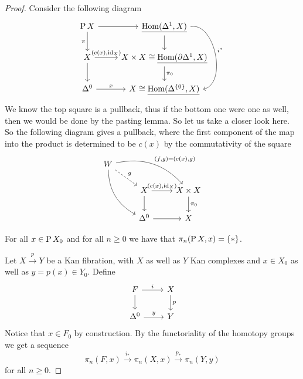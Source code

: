 \begin{proof}
    Consider the following diagram
    \[
    \begin{tikzcd}
        \Pathspace X 
        \ar[r]
        \ar[d, "\pi"']
        &
        \underline{\Hom(\Delta^1, X)}
        \ar[d]
        \ar[dd, bend left=90, "i^*"]
        \\
        X
        \ar[r, "{(c(x), \id_X)}"]
        \ar[d]
        &
        X \times X \cong \underline{\Hom ( \partial \Delta^1, X)}
        \ar[d, "\pi_0"]
        \\
        \Delta^0
        \ar[r, "x"]
        &
        X 
        \cong
        \underline{\Hom ( \Delta^{\{0\}}, X)}
    \end{tikzcd}
    \]
    We know the top square is a pullback, thus if the bottom one were one as well, then we would be done by the pasting lemma. So let us take a closer look here. 
    So the following diagram gives a pullback, where the first component of the map into the product is determined to be $c(x)$ by the commutativity of the square
    \[
    \begin{tikzcd}
        W 
        \ar[rdd, bend right]
        \ar[rrd, bend left, "{(f,g)=(c(x),g)}"]
        \ar[rd, dashed, "g"]
        &&
        \\
        &
        X
        \ar[r, "{(c(x), \id_X)}"]
        \ar[d]
        &
        X \times X
        \ar[d, "\pi_0"]
        \\
        &
        \Delta^0
        \ar[r]
        &
        X
    \end{tikzcd}
    \]
    \begin{cor}
        For all $x \in \operatorname{P} X_0$ and for all $n \geq 0$ we have that $\pi_n(\operatorname{P} X, x)= \{*\}$. 
    \end{cor}
    Let $X \xrightarrow{p} Y$ be a Kan fibration, with $X$ as well as $Y$ Kan complexes and $x \in X_0$ as well as $y=p(x) \in Y_0$. 
    Define
    \[
    \begin{tikzcd}
        F 
        \ar[r, "i"]
        \ar[d]
        &
        X
        \ar[d, "p"]
        \\
        \Delta^0 
        \ar[r, "y"]
        &
        Y
    \end{tikzcd}
    \]
    Notice that $x \in F_0$ by construction.
    By the functoriality of the homotopy groups we get a sequence 
    \[
    \pi_n(F,x)
    \xrightarrow{i_*}
    \pi_n(X,x)
    \xrightarrow{p_*}
    \pi_n(Y,y)
    \]
    for all $n \geq 0$.
\end{proof}

